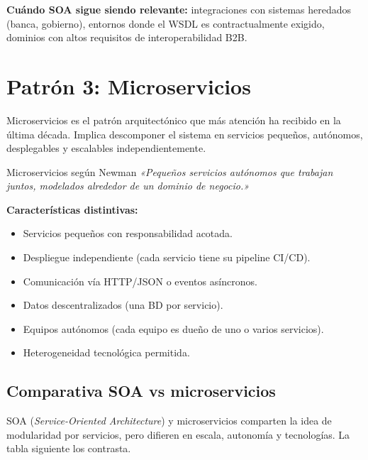 \textbf{Cuándo SOA sigue siendo relevante:} integraciones con
sistemas heredados (banca, gobierno), entornos donde el WSDL es
contractualmente exigido, dominios con altos requisitos de
interoperabilidad B2B.

\section{Patrón 3: Microservicios}

Microservicios es el patrón arquitectónico que más atención
ha recibido en la última década. Implica descomponer el sistema en
servicios pequeños, autónomos, desplegables y escalables
independientemente.


\begin{cajadefinicion}{Microservicios según Newman}
\emph{«Pequeños servicios autónomos que trabajan juntos, modelados
alrededor de un dominio de negocio.»} \cite{newman2021building}

\textbf{Características distintivas:}
\begin{itemize}
\item Servicios pequeños con responsabilidad acotada.
\item Despliegue independiente (cada servicio tiene su pipeline CI/CD).
\item Comunicación vía HTTP/JSON o eventos asíncronos.
\item Datos descentralizados (una BD por servicio).
\item Equipos autónomos (cada equipo es dueño de uno o varios servicios).
\item Heterogeneidad tecnológica permitida.
\end{itemize}
\end{cajadefinicion}

\subsection{Comparativa SOA vs microservicios}

SOA (\emph{Service-Oriented Architecture}) y microservicios
comparten la idea de modularidad por servicios, pero difieren en
escala, autonomía y tecnologías. La tabla siguiente los contrasta.



